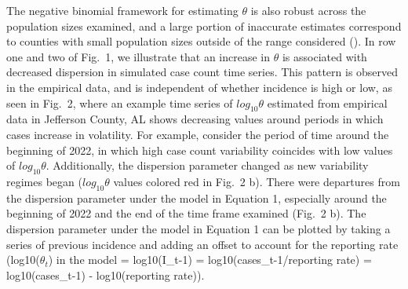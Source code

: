 \documentclass[10pt,letterpaper]{article}
\begin{document}
The negative binomial framework for estimating \begin{math}\theta\end{math} is also robust across the population sizes examined, and a large portion of inaccurate estimates correspond to counties with small population sizes outside of the range considered ().
In row one and two of Fig.\ 1, we illustrate that an increase in \begin{math}\theta\end{math} is associated with decreased dispersion in simulated case count time series. This pattern is observed in the empirical data, and is independent of whether incidence is high or low, as seen in Fig.\ 2, where an example time series of $log_{10}\theta$ estimated from empirical data in Jefferson County, AL shows decreasing values around periods in which cases increase in volatility. For example, consider the period of time around the beginning of 2022, in which high case count variability coincides with low values of $log_{10}\theta$. 
Additionally, the dispersion parameter changed as new variability regimes began ($log_{10}\theta$ values colored red in Fig.\ 2 b). There were departures from the dispersion parameter under the model in Equation 1, especially around the beginning of 2022 and the end of the time frame examined (Fig.\ 2 b). The dispersion parameter under the model in Equation 1 can be plotted by taking a series of previous incidence and adding an offset to account for the reporting rate (log10($\theta_t$) in the model = log10(I_{t-1}) = log10(cases_{t-1}/reporting rate) = log10(cases_{t-1}) - log10(reporting rate)).
\end{document}
